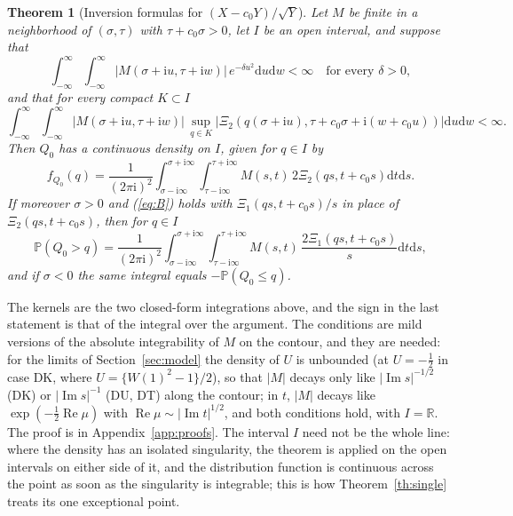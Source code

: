 \documentclass[ecta,nameyear,final]{econsocart}
\newcommand{\PP}{{\mathbb P}}
\newcommand{\dr}[1]{{\mathrm d}#1}
\newcommand{\iu}{{\mathrm i}}
\newcommand{\Rea}{\operatorname{Re}}
\newcommand{\Ima}{\operatorname{Im}}
\newcommand{\Fk}{\textsf{\upshape DK}}
\newcommand{\Fu}{\textsf{\upshape DU}}
\newcommand{\Ft}{\textsf{\upshape DT}}
\theoremstyle{plain}
\newtheorem{theorem}{Theorem}
\theoremstyle{definition}
\begin{document}
\begin{theorem}[Inversion formulas for $(X-c_0Y)/\sqrt Y$]
\label{th:inv}
Let $M$ be finite in a neighborhood of $(\sigma,\tau)$ with $\tau+c_0\sigma>0$, let $I$ be an open interval, and suppose that
\begin{equation}
\int_{-\infty}^{\infty}\int_{-\infty}^{\infty}|M(\sigma+\iu u,\tau+\iu w)|\,e^{-\delta u^2}\dr{u}\dr{w}<\infty\quad\text{for every }\delta>0,
\label{eq:A}
\end{equation}
and that for every compact $K\subset I$
\begin{equation}
\int_{-\infty}^{\infty}\int_{-\infty}^{\infty}|M(\sigma+\iu u,\tau+\iu w)|\,\sup_{q\in K}|\Xi_2(q(\sigma+\iu u),\tau+c_0\sigma+\iu(w+c_0u))|\dr{u}\dr{w}<\infty.
\label{eq:B}
\end{equation}
Then $Q_0$ has a continuous density on $I$, given for $q\in I$ by
\begin{equation}
f_{Q_0}(q)=\frac{1}{(2\pi\iu)^2}\int_{\sigma-\iu\infty}^{\sigma+\iu\infty}\int_{\tau-\iu\infty}^{\tau+\iu\infty}
M(s,t)\,2\Xi_2(qs,t+c_0s)\dr{t}\dr{s}.
\label{eq:dinv}
\end{equation}
If moreover $\sigma>0$ and (\ref{eq:B}) holds with $\Xi_1(qs,t+c_0s)/s$ in place of $\Xi_2(qs,t+c_0s)$, then for $q\in I$
\begin{equation}
\PP(Q_0>q)=\frac{1}{(2\pi\iu)^2}\int_{\sigma-\iu\infty}^{\sigma+\iu\infty}\int_{\tau-\iu\infty}^{\tau+\iu\infty}
M(s,t)\,\frac{2\Xi_1(qs,t+c_0s)}{s}\dr{t}\dr{s},
\label{eq:cinv}
\end{equation}
and if $\sigma<0$ the same integral equals $-\PP(Q_0\le q)$.
\end{theorem}

The kernels are the two closed-form integrations above, and the sign in the last statement is that of the integral over the argument.  The conditions are mild versions of the absolute integrability of $M$ on the contour, and they are needed: for the limits of Section~\ref{sec:model} the density of $U$ is unbounded (at $U=-\frac12$ in case \Fk, where $U=\{W(1)^2-1\}/2$), so that $|M|$ decays only like $|\Ima s|^{-1/2}$ (\Fk) or $|\Ima s|^{-1}$ (\Fu, \Ft) along the contour; in $t$, $|M|$ decays like $\exp(-\frac12\Rea\mu)$ with $\Rea\mu\sim|\Ima t|^{1/2}$, and both conditions hold, with $I=\mathbb{R}$.  The proof is in Appendix~\ref{app:proofs}.  The interval $I$ need not be the whole line: where the density has an isolated singularity, the theorem is applied on the open intervals on either side of it, and the distribution function is continuous across the point as soon as the singularity is integrable; this is how Theorem~\ref{th:single} treats its one exceptional point.
\end{document}
